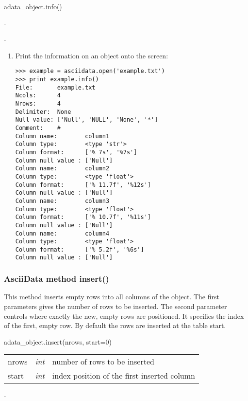 adata\_object.info()

-

-

\begin{enumerate}
\item Print the information on an \ad object onto the screen:
\begin{small}
\begin{verbatim}
>>> example = asciidata.open('example.txt')
>>> print example.info()
File:       example.txt
Ncols:      4
Nrows:      4
Delimiter:  None
Null value: ['Null', 'NULL', 'None', '*']
Comment:    #
Column name:        column1
Column type:        <type 'str'>
Column format:      ['% 7s', '%7s']
Column null value : ['Null']
Column name:        column2
Column type:        <type 'float'>
Column format:      ['% 11.7f', '%12s']
Column null value : ['Null']
Column name:        column3
Column type:        <type 'float'>
Column format:      ['% 10.7f', '%11s']
Column null value : ['Null']
Column name:        column4
Column type:        <type 'float'>
Column format:      ['% 5.2f', '%6s']
Column null value : ['Null']
\end{verbatim}
\end{small}
\end{enumerate}

\subsubsection{AsciiData method insert()}
\label{adm_insert}
This method inserts empty rows into all columns of the \ad object.
The first parameters gives the number of rows to be inserted.
The second parameter controls where exactly the new, empty rows
are positioned. It specifies the index of the first, empty row.
By default the rows are inserted at the table start.

adata\_object.insert(nrows, start=0)

\begin{tabular}{lcl}
nrows &{\it int}& number of rows to be inserted\\
start &{\it int}& index position of the first inserted column\\
\end{tabular}

-

